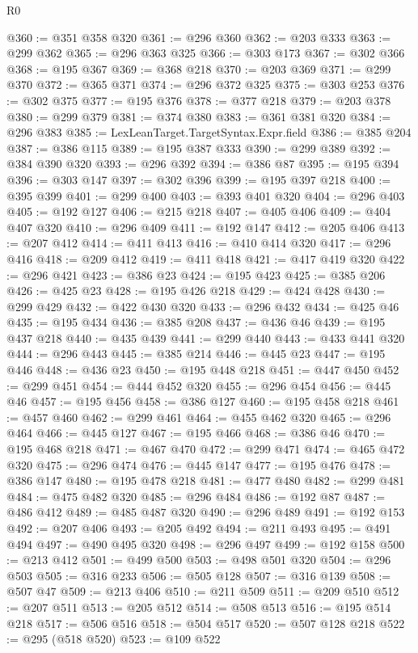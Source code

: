 \begin{lexlean}{R0}
\begin{coremodule}
@360 := @351 @358 @320
@361 := @296 @360
@362 := @203 @333
@363 := @299 @362
@365 := @296 @363 @325
@366 := @303 @173
@367 := @302 @366
@368 := @195 @367
@369 := @368 @218
@370 := @203 @369
@371 := @299 @370
@372 := @365 @371
@374 := @296 @372 @325
@375 := @303 @253
@376 := @302 @375
@377 := @195 @376
@378 := @377 @218
@379 := @203 @378
@380 := @299 @379
@381 := @374 @380
@383 := @361 @381 @320
@384 := @296 @383
@385 := LexLeanTarget.TargetSyntax.Expr.field
@386 := @385 @204
@387 := @386 @115
@389 := @195 @387 @333
@390 := @299 @389
@392 := @384 @390 @320
@393 := @296 @392
@394 := @386 @87
@395 := @195 @394
@396 := @303 @147
@397 := @302 @396
@399 := @195 @397 @218
@400 := @395 @399
@401 := @299 @400
@403 := @393 @401 @320
@404 := @296 @403
@405 := @192 @127
@406 := @215 @218
@407 := @405 @406
@409 := @404 @407 @320
@410 := @296 @409
@411 := @192 @147
@412 := @205 @406
@413 := @207 @412
@414 := @411 @413
@416 := @410 @414 @320
@417 := @296 @416
@418 := @209 @412
@419 := @411 @418
@421 := @417 @419 @320
@422 := @296 @421
@423 := @386 @23
@424 := @195 @423
@425 := @385 @206
@426 := @425 @23
@428 := @195 @426 @218
@429 := @424 @428
@430 := @299 @429
@432 := @422 @430 @320
@433 := @296 @432
@434 := @425 @46
@435 := @195 @434
@436 := @385 @208
@437 := @436 @46
@439 := @195 @437 @218
@440 := @435 @439
@441 := @299 @440
@443 := @433 @441 @320
@444 := @296 @443
@445 := @385 @214
@446 := @445 @23
@447 := @195 @446
@448 := @436 @23
@450 := @195 @448 @218
@451 := @447 @450
@452 := @299 @451
@454 := @444 @452 @320
@455 := @296 @454
@456 := @445 @46
@457 := @195 @456
@458 := @386 @127
@460 := @195 @458 @218
@461 := @457 @460
@462 := @299 @461
@464 := @455 @462 @320
@465 := @296 @464
@466 := @445 @127
@467 := @195 @466
@468 := @386 @46
@470 := @195 @468 @218
@471 := @467 @470
@472 := @299 @471
@474 := @465 @472 @320
@475 := @296 @474
@476 := @445 @147
@477 := @195 @476
@478 := @386 @147
@480 := @195 @478 @218
@481 := @477 @480
@482 := @299 @481
@484 := @475 @482 @320
@485 := @296 @484
@486 := @192 @87
@487 := @486 @412
@489 := @485 @487 @320
@490 := @296 @489
@491 := @192 @153
@492 := @207 @406
@493 := @205 @492
@494 := @211 @493
@495 := @491 @494
@497 := @490 @495 @320
@498 := @296 @497
@499 := @192 @158
@500 := @213 @412
@501 := @499 @500
@503 := @498 @501 @320
@504 := @296 @503
@505 := @316 @233
@506 := @505 @128
@507 := @316 @139
@508 := @507 @47
@509 := @213 @406
@510 := @211 @509
@511 := @209 @510
@512 := @207 @511
@513 := @205 @512
@514 := @508 @513
@516 := @195 @514 @218
@517 := @506 @516
@518 := @504 @517
@520 := @507 @128 @218
@522 := @295 (@518 @520)
@523 := @109 @522

\end{coremodule}
\end{lexlean}
